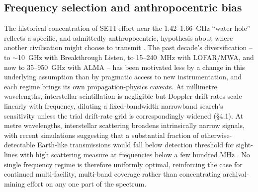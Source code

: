 \documentclass[10pt,twocolumn]{article}
\begin{document}
\subsection{Frequency selection and anthropocentric bias}
The historical concentration of SETI effort near the 1.42--1.66~GHz ``water hole'' reflects a specific, and admittedly anthropocentric, hypothesis about where another civilisation might choose to transmit \citep{oliver1971}. The past decade's diversification -- to $\sim$10~GHz with Breakthrough Listen, to 15--240~MHz with LOFAR/MWA, and now to 35--950~GHz with ALMA -- has been motivated less by a change in this underlying assumption than by pragmatic access to new instrumentation, and each regime brings its own propagation-physics caveats. At millimetre wavelengths, interstellar scintillation is negligible but Doppler drift rates scale linearly with frequency, diluting a fixed-bandwidth narrowband search's sensitivity unless the trial drift-rate grid is correspondingly widened (\S4.1). At metre wavelengths, interstellar scattering broadens intrinsically narrow signals, with recent simulations suggesting that a substantial fraction of otherwise-detectable Earth-like transmissions would fall below detection threshold for sight-lines with high scattering measure at frequencies below a few hundred MHz \citep{cordes1991}. No single frequency regime is therefore uniformly optimal, reinforcing the case for continued multi-facility, multi-band coverage rather than concentrating archival-mining effort on any one part of the spectrum.
\end{document}
